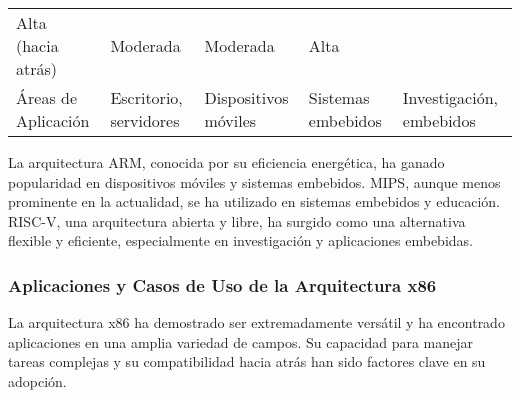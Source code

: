 \documentclass[12pt,twoside]{templates/unerthesis}
\begin{document}
\begin{longtable}[]{@{}lllll@{}}
\begin{minipage}[t]{0.18\columnwidth}
Alta (hacia atrás)\strut
\end{minipage} & \begin{minipage}[t]{0.16\columnwidth}\raggedright
Moderada\strut
\end{minipage} & \begin{minipage}[t]{0.15\columnwidth}\raggedright
Moderada\strut
\end{minipage} & \begin{minipage}[t]{0.20\columnwidth}\raggedright
Alta\strut
\end{minipage}\tabularnewline
\begin{minipage}[t]{0.17\columnwidth}\raggedright
Áreas de Aplicación\strut
\end{minipage} & \begin{minipage}[t]{0.18\columnwidth}\raggedright
Escritorio, servidores\strut
\end{minipage} & \begin{minipage}[t]{0.16\columnwidth}\raggedright
Dispositivos móviles\strut
\end{minipage} & \begin{minipage}[t]{0.15\columnwidth}\raggedright
Sistemas embebidos\strut
\end{minipage} & \begin{minipage}[t]{0.20\columnwidth}\raggedright
Investigación, embebidos\strut
\end{minipage}\tabularnewline
\bottomrule
\end{longtable}

La arquitectura ARM, conocida por su eficiencia energética, ha ganado popularidad en dispositivos móviles y sistemas embebidos. MIPS, aunque menos prominente en la actualidad, se ha utilizado en sistemas embebidos y educación. RISC-V, una arquitectura abierta y libre, ha surgido como una alternativa flexible y eficiente, especialmente en investigación y aplicaciones embebidas.

\hypertarget{aplicaciones-y-casos-de-uso-de-la-arquitectura-x86}{%
\subsubsection{Aplicaciones y Casos de Uso de la Arquitectura x86}\label{aplicaciones-y-casos-de-uso-de-la-arquitectura-x86}}

La arquitectura x86 ha demostrado ser extremadamente versátil y ha encontrado aplicaciones en una amplia variedad de campos. Su capacidad para manejar tareas complejas y su compatibilidad hacia atrás han sido factores clave en su adopción.
\end{document}
